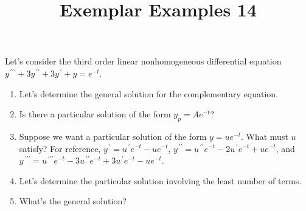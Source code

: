 \documentclass{ximera}
\begin{document}
\begin{abstract}
 \end{abstract}

    \title{Exemplar Examples 14}
    
    \maketitle



Let's consider the third order linear nonhomogeneous differential equation \\$y^{\,\prime\prime\prime}+3y^{\,\prime\prime}+3y^{\,\prime}+y=e^{-t}$.

\begin{enumerate}
    \item Let's determine the general solution for the complementary equation.

    \vfill

    \item Is there a particular solution of the form $y_p=Ae^{-t}$?

    \vspace{5cm}

    \newpage
    

    \item Suppose we want a particular solution of the form $y=ue^{-t}$.  What must $u$ satisfy?  For reference, $y^{\,\prime}=u^{\,\prime}e^{-t}-ue^{-t}$, $y^{\,\prime\prime}=u^{\,\prime\prime}e^{-t}-2u^{\,\prime}e^{-t}+ue^{-t}$, and $y^{\,\prime\prime\prime}=u^{\,\prime\prime\prime}e^{-t}-3u^{\,\prime\prime}e^{-t}+3u^{\,\prime}e^{-t}-ue^{-t}$.

    \vfill

    \item Let's determine the particular solution involving the least number of terms.

    \vspace{1cm}

    \item What's the general solution?

\vspace{2cm}    

    
\end{enumerate}
\end{document}
